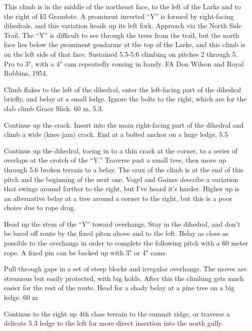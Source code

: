 \documentclass{tahquitz}
\begin{document}
This climb is in the middle of the northeast face, to the left of the
Larks and to the right of El Grandote. A prominent inverted ``Y'' is
formed by right-facing dihedrals, and this variation heads up its
left fork. Approach via the North Side Trail. The ``Y'' is difficult to
see through the trees from the trail, but the north face lies below
the prominent gendarme at the top of the Larks, and this climb is on
the left side of that face. Sustained 5.5-5.6 climbing on pitches 2
through 5. Pro to 3", with  a 4" cam repeatedly coming in handy.
FA Don Wilson and Royal Robbins, 1954.

 Climb flakes to the left of the dihedral, enter the left-facing
part of the dihedral briefly, and belay at a small ledge. Ignore the
bolts to the right, which are for the slab climb Grace Slick. 60 m,
5.3.

 Continue up the crack. Insert into the main right-facing part of
the dihedral and climb a wide (knee jam) crack. End at a bolted
anchor on a huge ledge. 5.5

 Continue up the dihedral, toeing in to a thin crack at the
corner, to a series of overlaps at the crotch of the ``Y.'' Traverse
past a small tree, then move up through 5.6 broken terrain to a
belay. The crux of the climb is at the end of this pitch and the
beginning of the next one. Vogel and Gaines describe a variation that
swings around farther to the right, but I've heard it's harder.
Higher up is an alternative belay at a tree around a corner to the
right, but this is a poor choice due to rope drag.

 Head up the stem of the ``Y'' toward overhangs. Stay in the
dihedral, and don't be lured off route by the fixed piton above and
to the left. Belay as close as possible to the overhangs in order to
complete the following pitch with a 60 meter rope. A fixed pin can be
backed up with 3" or 4" cams.

 Pull through gaps in a set of steep blocks and irregular
overhangs. The  moves are strenuous but easily protected, with big
holds. After this the climbing gets much easier for the rest of the
route. Head for a shady belay at a pine tree on a big ledge. 60 m

 Continue to the right up 4th class terrain to the summit ridge,
or traverse a delicate 5.3 ledge to the left for more direct
insertion into the north gully.

\end{document}
